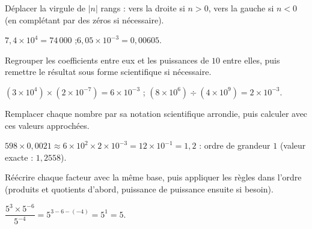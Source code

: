 Déplacer la virgule de $|n|$ rangs : vers la droite si $n>0$, vers la gauche si $n<0$ (en
complétant par des zéros si nécessaire).
\begin{exemple}
$7{,}4\times10^{4}=74\,000$ ;\quad $6{,}05\times10^{-3}=0{,}00605$.
\end{exemple}

Regrouper les coefficients entre eux et les puissances de $10$ entre elles, puis remettre le
résultat sous forme scientifique si nécessaire.
\begin{exemple}
$(3\times10^{4})\times(2\times10^{-7})=6\times10^{-3}$ ;\quad
$(8\times10^{6})\div(4\times10^{9})=2\times10^{-3}$.
\end{exemple}

Remplacer chaque nombre par sa notation scientifique arrondie, puis calculer avec ces valeurs
approchées.
\begin{exemple}
$598\times0{,}0021\approx6\times10^{2}\times2\times10^{-3}=12\times10^{-1}=1{,}2$ : ordre de
grandeur $1$ (valeur exacte : $1{,}2558$).
\end{exemple}

Réécrire chaque facteur avec la même base, puis appliquer les règles dans l'ordre (produits
et quotients d'abord, puissance de puissance ensuite si besoin).
\begin{exemple}
$\dfrac{5^{3}\times5^{-6}}{5^{-4}}=5^{3-6-(-4)}=5^{1}=5$.
\end{exemple}

